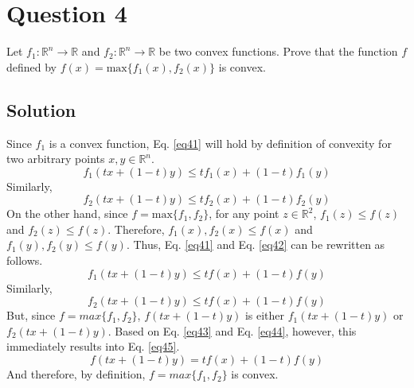 \section*{Question 4}

Let $f_1: \mathbb{R}^n \longrightarrow \mathbb{R}$ and $f_2: \mathbb{R}^n \longrightarrow \mathbb{R}$ be two convex functions. Prove that the function $f$ defined by $f(x) = \text{max}\{f_1(x), f_2(x)\}$ is convex.

\subsection*{Solution}

Since $f_1$ is a convex function, Eq. \ref{eq41} will hold by definition of convexity for two arbitrary points $x, y \in \mathbb{R}^n$.
\begin{equation}
f_1(tx+(1-t)y)\leq tf_1(x) + (1-t)f_1(y)
\label{eq41}
\end{equation}
Similarly,
\begin{equation}
f_2(tx+(1-t)y)\leq tf_2(x) + (1-t)f_2(y)
\label{eq42}
\end{equation}
On the other hand, since $f = \text{max}\{f_1, f_2\}$, for any point $z \in \mathbb{R}^2$, $f_1(z) \leq f(z)$ and $f_2(z) \leq f(z)$. Therefore, $f_1(x), f_2(x) \leq f(x)$ and $f_1(y), f_2(y) \leq f(y)$. Thus, Eq. \ref{eq41} and Eq. \ref{eq42} can be rewritten as follows.
\begin{equation}
f_1(tx+(1-t)y)\leq tf(x) + (1-t)f(y)
\label{eq43}
\end{equation}
Similarly,
\begin{equation}
f_2(tx+(1-t)y)\leq tf(x) + (1-t)f(y)
\label{eq44}
\end{equation}
But, since $f = max\{f_1,f_2\}$, $f(tx+(1-t)y)$ is either $f_1(tx+(1-t)y)$ or $f_2(tx+(1-t)y)$. Based on Eq. \ref{eq43} and Eq. \ref{eq44}, however, this immediately results into Eq. \ref{eq45}.
\begin{equation}
f(tx+(1-t)y) = tf(x) + (1-t)f(y)
\label{eq45}
\end{equation}  
And therefore, by definition, $f = max\{f_1, f_2\}$ is convex.
